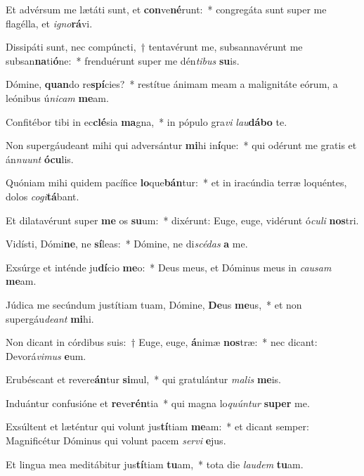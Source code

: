 \item Et advérsum me lætáti sunt, et \textbf{con}ve\textbf{né}runt:~* congregáta sunt super me flagélla, et \textit{i}\textit{gno}\textbf{rá}vi.
\item Dissipáti sunt, nec compúncti,~† tentavérunt me, subsannavérunt me subsan\textbf{na}ti\textbf{ó}ne:~* frenduérunt super me dén\textit{ti}\textit{bus} \textbf{su}is.
\item Dómine, \textbf{quan}do re\textbf{spí}cies?~* restítue ánimam meam a malignitáte eórum, a leónibus ú\textit{ni}\textit{cam} \textbf{me}am.
\item Confitébor tibi in ec\textbf{clé}sia \textbf{ma}gna,~* in pópulo gra\textit{vi} \textit{lau}\textbf{dá}\textbf{bo} te.
\item Non supergáudeant mihi qui adversántur \textbf{mi}hi in\textbf{í}que:~* qui odérunt me gratis et án\textit{nu}\textit{unt} \textbf{ó}\textbf{cu}lis.
\item Quóniam mihi quidem pacífice \textbf{lo}que\textbf{bán}tur:~* et in iracúndia terræ loquéntes, dolos \textit{co}\textit{gi}\textbf{tá}bant.
\item Et dilatavérunt super \textbf{me} os \textbf{su}um:~* dixérunt: Euge, euge, vidérunt ó\textit{cu}\textit{li} \textbf{nos}tri.
\item Vidísti, Dómi\textbf{ne}, ne \textbf{sí}leas:~* Dómine, ne di\textit{scé}\textit{das} \textbf{a} me.
\item Exsúrge et inténde ju\textbf{dí}cio \textbf{me}o:~* Deus meus, et Dóminus meus in \textit{cau}\textit{sam} \textbf{me}am.
\item Júdica me secúndum justítiam tuam, Dómine, \textbf{De}us \textbf{me}us,~* et non supergáu\textit{de}\textit{ant} \textbf{mi}hi.
\item Non dicant in córdibus suis:~† Euge, euge, \textbf{á}nimæ \textbf{nos}træ:~* nec dicant: Devorá\textit{vi}\textit{mus} \textbf{e}um.
\item Erubéscant et revere\textbf{án}tur \textbf{si}mul,~* qui gratulántur \textit{ma}\textit{lis} \textbf{me}is.
\item Induántur confusióne et \textbf{re}ve\textbf{rén}tia~* qui magna lo\textit{quún}\textit{tur} \textbf{su}\textbf{per} me.
\item Exsúltent et læténtur qui volunt jus\textbf{tí}tiam \textbf{me}am:~* et dicant semper: Magnificétur Dóminus qui volunt pacem \textit{ser}\textit{vi} \textbf{e}jus.
\item Et lingua mea meditábitur jus\textbf{tí}tiam \textbf{tu}am,~* tota die \textit{lau}\textit{dem} \textbf{tu}am.
